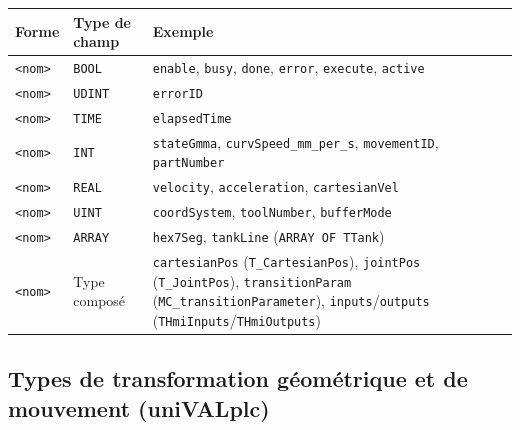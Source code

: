 \begin{center}
    \begin{tabular}{|p{2.6cm}|p{5.4cm}|p{6.2cm}|}
        \hline
        \textbf{Forme} & \textbf{Type de champ} & \textbf{Exemple} \\
        \hline
        \texttt{<nom>} & \texttt{BOOL} & \texttt{enable}, \texttt{busy}, \texttt{done}, \texttt{error}, \texttt{execute}, \texttt{active} \\
        \hline
        \texttt{<nom>} & \texttt{UDINT} & \texttt{errorID} \\
        \hline
        \texttt{<nom>} & \texttt{TIME} & \texttt{elapsedTime} \\
        \hline
        \texttt{<nom>} & \texttt{INT} & \texttt{stateGmma}, \texttt{curvSpeed\_mm\_per\_s}, \texttt{movementID}, \texttt{partNumber} \\
        \hline
        \texttt{<nom>} & \texttt{REAL} & \texttt{velocity}, \texttt{acceleration}, \texttt{cartesianVel} \\
        \hline
        \texttt{<nom>} & \texttt{UINT} & \texttt{coordSystem}, \texttt{toolNumber}, \texttt{bufferMode} \\
        \hline
        \texttt{<nom>} & \texttt{ARRAY} & \texttt{hex7Seg}, \texttt{tankLine} (\texttt{ARRAY OF TTank}) \\
        \hline
        \texttt{<nom>} & Type composé & \texttt{cartesianPos} (\texttt{T\_CartesianPos}), \texttt{jointPos} (\texttt{T\_JointPos}), \texttt{transitionParam} (\texttt{MC\_transitionParameter}), \texttt{inputs}/\texttt{outputs} (\texttt{THmiInputs}/\texttt{THmiOutputs}) \\
        \hline
    \end{tabular}
\end{center}


\subsection{Types de transformation géométrique et de mouvement (uniVALplc)}

